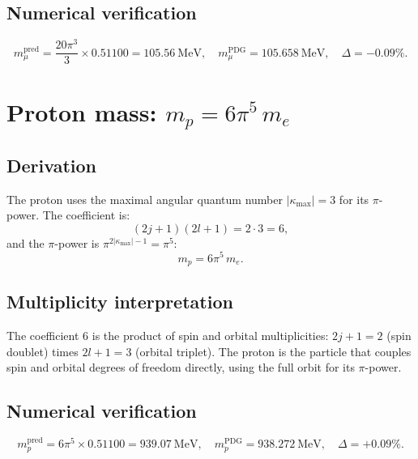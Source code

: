 \documentclass[11pt,letterpaper]{article}
\numberwithin{equation}{section}
\begin{document}
\subsection{Numerical verification}

\begin{equation}
  m_\mu^\mathrm{pred} = \frac{20\pi^3}{3} \times 0.51100 = 105.56~\mathrm{MeV},
  \quad m_\mu^\mathrm{PDG} = 105.658~\mathrm{MeV},
  \quad \Delta = -0.09\%.
\end{equation}

\section{Proton mass: $m_p = 6\pi^5\,m_e$}
\label{sec:proton}

\subsection{Derivation}

The proton uses the maximal angular quantum number $|\kappa_\mathrm{max}| = 3$
for its $\pi$-power. The coefficient is:
\begin{equation}
\label{eq:proton_coeff}
  (2j+1)(2l+1) = 2 \cdot 3 = 6,
\end{equation}
and the $\pi$-power is $\pi^{2|\kappa_\mathrm{max}|-1} = \pi^5$:
\begin{equation}
\label{eq:m_p}
\boxed{
  m_p = 6\pi^5\,m_e.
}
\end{equation}

\subsection{Multiplicity interpretation}

The coefficient 6 is the product of spin and orbital multiplicities:
$2j+1 = 2$ (spin doublet) times $2l+1 = 3$ (orbital triplet). The proton
is the particle that couples spin and orbital degrees of freedom directly,
using the full orbit for its $\pi$-power.

\subsection{Numerical verification}

\begin{equation}
  m_p^\mathrm{pred} = 6\pi^5 \times 0.51100 = 939.07~\mathrm{MeV},
  \quad m_p^\mathrm{PDG} = 938.272~\mathrm{MeV},
  \quad \Delta = +0.09\%.
\end{equation}
\end{document}
